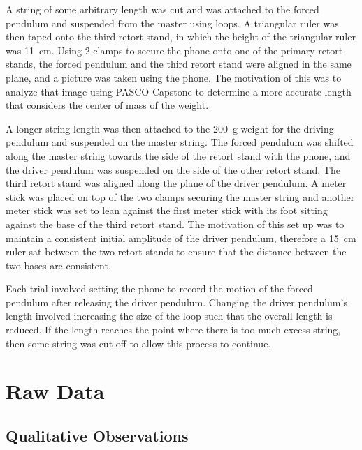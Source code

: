 \documentclass[letterpaper, 12pt]{article}
\begin{document}
A string of some arbitrary length was cut and
was attached to the forced pendulum and suspended
from the master using loops. A triangular ruler
was then taped onto the third retort stand,
in which the height of the triangular ruler was
\SI{11}{cm}. Using 2 clamps to secure the phone onto one
of the primary retort stands, the forced pendulum
and the third retort stand were aligned in the
same plane, and a picture was taken using the phone.
The motivation of this was to analyze
that image using PASCO Capstone to determine
a more accurate length that
considers the center of mass of the weight.

A longer string length was then attached
to the \SI{200}{g} weight for the driving
pendulum and suspended on the master string.
The forced pendulum was shifted along the
master string towards the side of the retort
stand with the phone, and the driver pendulum
was suspended on the side of the other
retort stand. The third retort stand
was aligned along the plane of the
driver pendulum. A meter stick was placed
on top of the two clamps securing the master
string and another meter stick was
set to lean against the first meter stick
with its foot sitting against the base
of the third retort stand. The motivation
of this set up was to maintain a consistent
initial amplitude of the driver
pendulum, therefore a \SI{15}{cm}
ruler sat between the two
retort stands to ensure that the distance between
the two bases are consistent.

Each trial involved setting the phone
to record the motion of the forced
pendulum after releasing the driver
pendulum. Changing the driver pendulum's
length involved increasing the size of the loop
such that the overall length is reduced.
If the length reaches the point where
there is too much excess string, then
some string was cut off to allow this process
to continue.



\section{Raw Data}

\subsection{Qualitative Observations}
\end{document}
